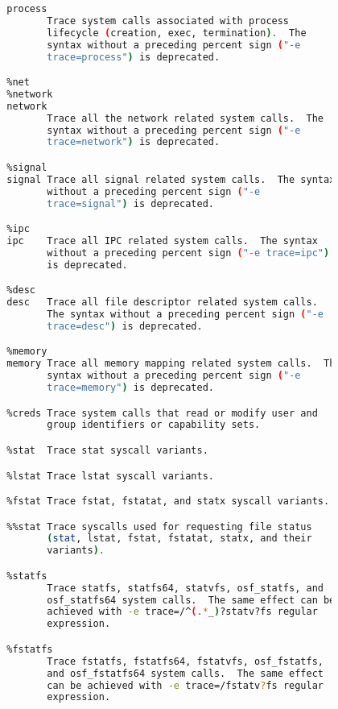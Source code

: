 {{\begin{lstlisting}[language=bash]
              %process
              process
                     Trace system calls associated with process
                     lifecycle (creation, exec, termination).  The
                     syntax without a preceding percent sign ("-e
                     trace=process") is deprecated.

              %net
              %network
              network
                     Trace all the network related system calls.  The
                     syntax without a preceding percent sign ("-e
                     trace=network") is deprecated.

              %signal
              signal Trace all signal related system calls.  The syntax
                     without a preceding percent sign ("-e
                     trace=signal") is deprecated.

              %ipc
              ipc    Trace all IPC related system calls.  The syntax
                     without a preceding percent sign ("-e trace=ipc")
                     is deprecated.

              %desc
              desc   Trace all file descriptor related system calls.
                     The syntax without a preceding percent sign ("-e
                     trace=desc") is deprecated.

              %memory
              memory Trace all memory mapping related system calls.  The
                     syntax without a preceding percent sign ("-e
                     trace=memory") is deprecated.

              %creds Trace system calls that read or modify user and
                     group identifiers or capability sets.

              %stat  Trace stat syscall variants.

              %lstat Trace lstat syscall variants.

              %fstat Trace fstat, fstatat, and statx syscall variants.

              %%stat Trace syscalls used for requesting file status
                     (stat, lstat, fstat, fstatat, statx, and their
                     variants).

              %statfs
                     Trace statfs, statfs64, statvfs, osf_statfs, and
                     osf_statfs64 system calls.  The same effect can be
                     achieved with -e trace=/^(.*_)?statv?fs regular
                     expression.

              %fstatfs
                     Trace fstatfs, fstatfs64, fstatvfs, osf_fstatfs,
                     and osf_fstatfs64 system calls.  The same effect
                     can be achieved with -e trace=/fstatv?fs regular
                     expression.


\end{lstlisting}}}
